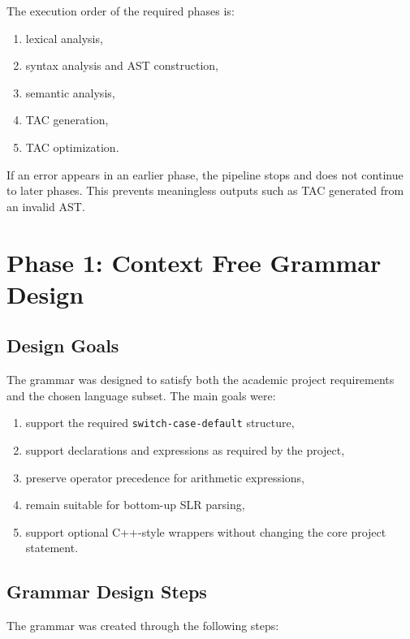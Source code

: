 \documentclass[12pt,a4paper]{article}
\begin{document}
The execution order of the required phases is:

\begin{enumerate}
    \item lexical analysis,
    \item syntax analysis and AST construction,
    \item semantic analysis,
    \item TAC generation,
    \item TAC optimization.
\end{enumerate}

If an error appears in an earlier phase, the pipeline stops and does not continue to later phases. This prevents meaningless outputs such as TAC generated from an invalid AST.

\section{Phase 1: Context Free Grammar Design}
\subsection{Design Goals}
The grammar was designed to satisfy both the academic project requirements and the chosen language subset. The main goals were:

\begin{enumerate}
    \item support the required \texttt{switch-case-default} structure,
    \item support declarations and expressions as required by the project,
    \item preserve operator precedence for arithmetic expressions,
    \item remain suitable for bottom-up SLR parsing,
    \item support optional C++-style wrappers without changing the core project statement.
\end{enumerate}

\subsection{Grammar Design Steps}
The grammar was created through the following steps:
\end{document}
